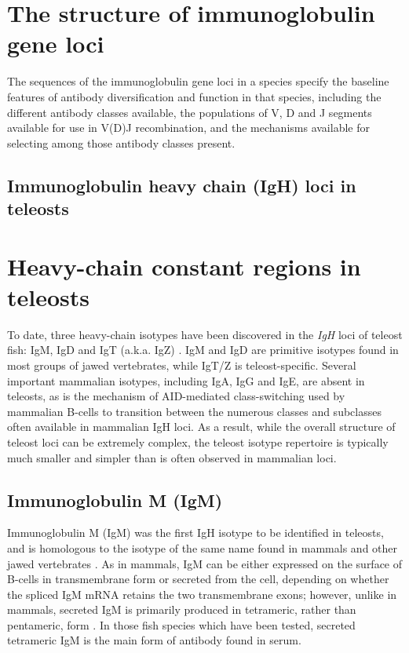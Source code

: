 \section{The structure of immunoglobulin gene loci}

The sequences of the immunoglobulin gene loci in a species specify the baseline features of antibody diversification and function in that species, including the different antibody classes available, the populations of V, D and J segments available for use in V(D)J recombination, and the mechanisms available for selecting among those antibody classes present. 

\subsection{Immunoglobulin heavy chain (IgH) loci in teleosts}

\section{Heavy-chain constant regions in teleosts} %

To date, three heavy-chain isotypes have been discovered in the \textit{IgH} loci of teleost fish: IgM, IgD and IgT (a.k.a. IgZ) \citep{fillatreau2013astonishing}. %
IgM and IgD are primitive isotypes found in most groups of jawed vertebrates, while IgT/Z is teleost-specific. Several important mammalian isotypes, including IgA, IgG and IgE, are absent in teleosts, as is the mechanism of AID-mediated class-switching used by mammalian B-cells to transition between the numerous classes and subclasses often available in mammalian IgH loci. As a result, while the overall structure of teleost loci can be extremely complex, the teleost isotype repertoire is typically much smaller and simpler than is often observed in mammalian loci. %

\subsection{Immunoglobulin M (IgM)}

Immunoglobulin M (IgM) was the first IgH isotype to be identified in teleosts, and is homologous to the isotype of the same name found in mammals and other jawed vertebrates %
. As in mammals, IgM can be either expressed on the surface of B-cells in transmembrane form or secreted from the cell, depending on whether the spliced IgM mRNA retains the two transmembrane exons; however, unlike in mammals, secreted IgM is primarily produced in tetrameric, rather than pentameric, form \citep{fillatreau2013astonishing} %
. In those fish species which have been tested, secreted tetrameric IgM is the main form of antibody found in serum.

